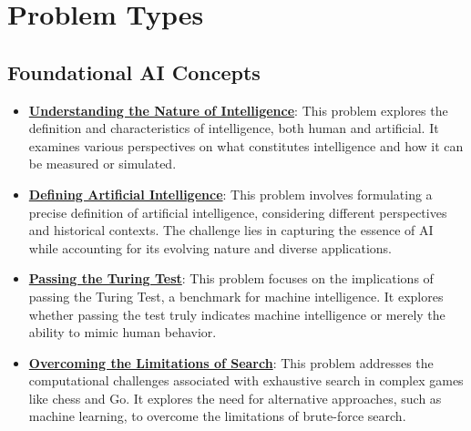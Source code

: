 \documentclass{article}%
\begin{document}
%
\section{Problem Types}%
\label{sec:ProblemTypes}%
\subsection{Foundational AI Concepts}%
\label{subsec:FoundationalAIConcepts}%
\begin{itemize}[leftmargin=*]%
\item \href{https://purdue.brightspace.com/d2l/common/assets/pdfjs-d2l-dist/1.0.14-legacy/web/viewer.html?file=\%2Fcontent\%2Fenforced\%2F1095467-wl.202510.CS.24300.001\%2F02L2-Intro.pdf\%3Fou\%3D1095467\&lang=en-us\&container=d2l-fileviewer-rendered-pdf\&fullscreen=d2l-fileviewer-rendered-pdf-dialog\&height=667#page=5}{\textbf{Understanding the Nature of Intelligence}}: This problem explores the definition and characteristics of intelligence, both human and artificial. It examines various perspectives on what constitutes intelligence and how it can be measured or simulated.%
\item \href{https://purdue.brightspace.com/d2l/common/assets/pdfjs-d2l-dist/1.0.14-legacy/web/viewer.html?file=\%2Fcontent\%2Fenforced\%2F1095467-wl.202510.CS.24300.001\%2F02L2-Intro.pdf\%3Fou\%3D1095467\&lang=en-us\&container=d2l-fileviewer-rendered-pdf\&fullscreen=d2l-fileviewer-rendered-pdf-dialog\&height=667#page=5}{\textbf{Defining Artificial Intelligence}}: This problem involves formulating a precise definition of artificial intelligence, considering different perspectives and historical contexts. The challenge lies in capturing the essence of AI while accounting for its evolving nature and diverse applications.%
\item \href{https://purdue.brightspace.com/d2l/common/assets/pdfjs-d2l-dist/1.0.14-legacy/web/viewer.html?file=\%2Fcontent\%2Fenforced\%2F1095467-wl.202510.CS.24300.001\%2F02L2-Intro.pdf\%3Fou\%3D1095467\&lang=en-us\&container=d2l-fileviewer-rendered-pdf\&fullscreen=d2l-fileviewer-rendered-pdf-dialog\&height=667#page=6}{\textbf{Passing the Turing Test}}: This problem focuses on the implications of passing the Turing Test, a benchmark for machine intelligence. It explores whether passing the test truly indicates machine intelligence or merely the ability to mimic human behavior.%
\item \href{https://purdue.brightspace.com/d2l/common/assets/pdfjs-d2l-dist/1.0.14-legacy/web/viewer.html?file=\%2Fcontent\%2Fenforced\%2F1095467-wl.202510.CS.24300.001\%2F02L2-Intro.pdf\%3Fou\%3D1095467\&lang=en-us\&container=d2l-fileviewer-rendered-pdf\&fullscreen=d2l-fileviewer-rendered-pdf-dialog\&height=667#page=11}{\textbf{Overcoming the Limitations of Search}}: This problem addresses the computational challenges associated with exhaustive search in complex games like chess and Go. It explores the need for alternative approaches, such as machine learning, to overcome the limitations of brute{-}force search.%

\end{itemize}
\end{document}
